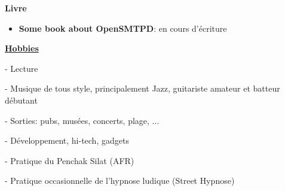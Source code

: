 \documentclass[a4paper,10pt]{letter}
\begin{document}
\textbf{Livre}
\begin{itemize}
\item	\textbf{Some book about OpenSMTPD}: en cours d'\'ecriture\\
\end{itemize}


\underline{\textbf{Hobbies}}\\
\begin{description}
\item - Lecture
\item - Musique de tous style, principalement Jazz, guitariste amateur et batteur d\'ebutant
\item - Sorties: pubs, mus\'ees, concerts, plage, ...
\item - D\'eveloppement, hi-tech, gadgets
\item - Pratique du Penchak Silat (AFR)
\item - Pratique occasionnelle de l'hypnose ludique (Street Hypnose)\\
\end{description}
\end{document}
